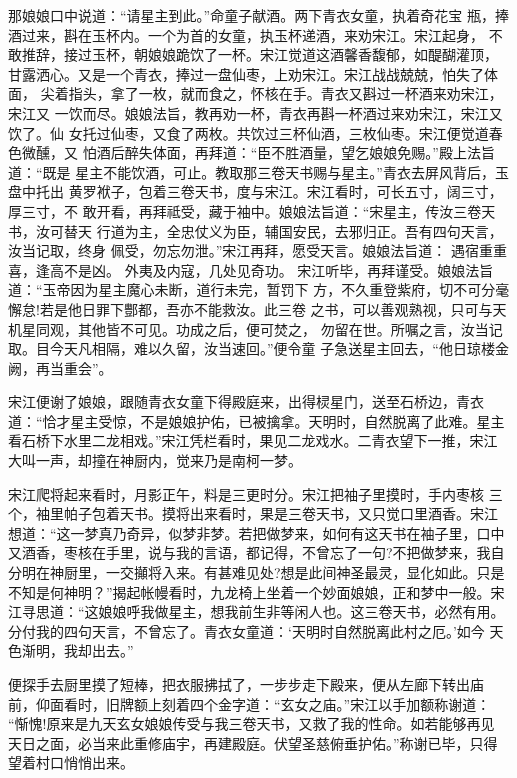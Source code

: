 那娘娘口中说道：“请星主到此。”命童子献酒。两下青衣女童，执着奇花宝
瓶，捧酒过来，斟在玉杯内。一个为首的女童，执玉杯递酒，来劝宋江。宋江起身，
不敢推辞，接过玉杯，朝娘娘跪饮了一杯。宋江觉道这酒馨香馥郁，如醍醐灌顶，
甘露洒心。又是一个青衣，捧过一盘仙枣，上劝宋江。宋江战战兢兢，怕失了体面，
尖着指头，拿了一枚，就而食之，怀核在手。青衣又斟过一杯酒来劝宋江，宋江又
一饮而尽。娘娘法旨，教再劝一杯，青衣再斟一杯酒过来劝宋江，宋江又饮了。仙
女托过仙枣，又食了两枚。共饮过三杯仙酒，三枚仙枣。宋江便觉道春色微醺，又
怕酒后醉失体面，再拜道：“臣不胜酒量，望乞娘娘免赐。”殿上法旨道：“既是
星主不能饮酒，可止。教取那三卷天书赐与星主。”青衣去屏风背后，玉盘中托出
黄罗袱子，包着三卷天书，度与宋江。宋江看时，可长五寸，阔三寸，厚三寸，不
敢开看，再拜祗受，藏于袖中。娘娘法旨道：“宋星主，传汝三卷天书，汝可替天
行道为主，全忠仗义为臣，辅国安民，去邪归正。吾有四句天言，汝当记取，终身
佩受，勿忘勿泄。”宋江再拜，愿受天言。娘娘法旨道：
遇宿重重喜，逢高不是凶。
外夷及内寇，几处见奇功。
宋江听毕，再拜谨受。娘娘法旨道：“玉帝因为星主魔心未断，道行未完，暂罚下
方，不久重登紫府，切不可分毫懈怠!若是他日罪下酆都，吾亦不能救汝。此三卷
之书，可以善观熟视，只可与天机星同观，其他皆不可见。功成之后，便可焚之，
勿留在世。所嘱之言，汝当记取。目今天凡相隔，难以久留，汝当速回。”便令童
子急送星主回去，“他日琼楼金阙，再当重会”。

宋江便谢了娘娘，跟随青衣女童下得殿庭来，出得棂星门，送至石桥边，青衣
道：“恰才星主受惊，不是娘娘护佑，已被擒拿。天明时，自然脱离了此难。星主
看石桥下水里二龙相戏。”宋江凭栏看时，果见二龙戏水。二青衣望下一推，宋江
大叫一声，却撞在神厨内，觉来乃是南柯一梦。

宋江爬将起来看时，月影正午，料是三更时分。宋江把袖子里摸时，手内枣核
三个，袖里帕子包着天书。摸将出来看时，果是三卷天书，又只觉口里酒香。宋江
想道：“这一梦真乃奇异，似梦非梦。若把做梦来，如何有这天书在袖子里，口中
又酒香，枣核在手里，说与我的言语，都记得，不曾忘了一句?不把做梦来，我自
分明在神厨里，一交攧将入来。有甚难见处?想是此间神圣最灵，显化如此。只是
不知是何神明？”揭起帐幔看时，九龙椅上坐着一个妙面娘娘，正和梦中一般。宋
江寻思道：“这娘娘呼我做星主，想我前生非等闲人也。这三卷天书，必然有用。
分付我的四句天言，不曾忘了。青衣女童道：‘天明时自然脱离此村之厄。’如今
天色渐明，我却出去。”

便探手去厨里摸了短棒，把衣服拂拭了，一步步走下殿来，便从左廊下转出庙
前，仰面看时，旧牌额上刻着四个金字道：“玄女之庙。”宋江以手加额称谢道：
“惭愧!原来是九天玄女娘娘传受与我三卷天书，又救了我的性命。如若能够再见
天日之面，必当来此重修庙宇，再建殿庭。伏望圣慈俯垂护佑。”称谢已毕，只得
望着村口悄悄出来。

